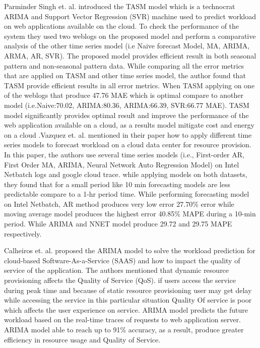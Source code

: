  Parminder Singh et. al. introduced the TASM model which is a technocrat ARIMA and Support Vector Regression (SVR) machine used to predict workload on web applications available on the cloud. To check the performance of the system they used two weblogs on the proposed model and perform a comparative analysis of the other time series model (i.e Naive forecast Model, MA, ARIMA, ARMA, AR, SVR). The proposed model provides efficient result in both seasonal pattern and non-seasonal pattern data. While comparing all the error metrics that are applied on TASM and other time series model, the author found that TASM provide efficient results in all error metrics. When TASM applying on one of the weblogs that produce 47.76 MAE which is optimal compare to another model (i.e.Naive:70.02, ARIMA:80.36, ARIMA:66.39, SVR:66.77 MAE). TASM model significantly provides optimal result and improve the performance of the web application available on a cloud, as a results model mitigate cost and energy on a cloud \cite{singh2019tasm}.Vazquez et. al. mentioned in their paper how to apply different time series models to forecast workload on a cloud data center for resource provision. In this paper, the authors use several time series models (i.e., First-order AR, First Order MA, ARIMA, Neural Network Auto Regression Model) on Intel Netbatch logs and google cloud trace. while applying models on both datasets, they found that for a small period like 10 min forecasting models are less predictable compare to a 1-hr period time. While performing forecasting model on Intel Netbatch, AR method produces very low error 27.70\% error while moving average model produces the highest error 40.85\% MAPE during a 10-min period. While ARIMA and NNET model produce 29.72 and 29.75 MAPE respectively\cite{vazquez2015time}.

Calheiros et. al. \cite{calheiros2014workload} proposed the ARIMA model to solve the workload prediction for cloud-based Software-As-a-Service (SAAS) and how to impact the quality of service of the application.
The authors mentioned that dynamic resource provisioning affects the Quality of Service (QoS). if users access the service during peak time and because of static resource provisioning user may get delay while accessing the service in this particular situation Quality Of service is poor which affects the user experience on service. ARIMA model predicts the future workload based on the real-time traces of requests to web application server.  ARIMA model able to reach up to 91\% accuracy, as a result, produce greater efficiency in resource usage and Quality of Service.


